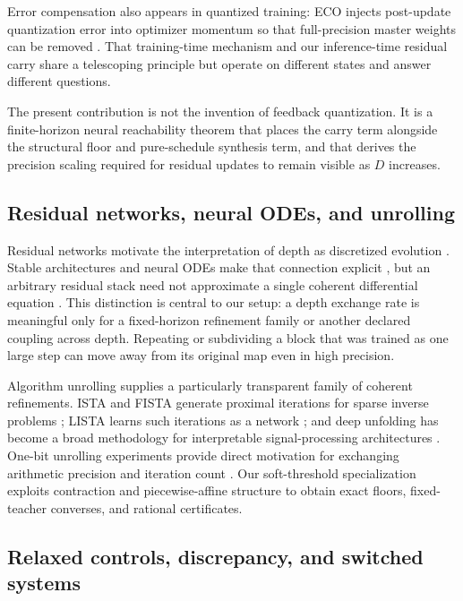 \documentclass[twoside,11pt]{article}
\begin{document}
Error compensation also appears in quantized training: ECO injects post-update quantization error into optimizer momentum so that full-precision master weights can be removed \citep{NikdanEtAl2026ECO}.  That training-time mechanism and our inference-time residual carry share a telescoping principle but operate on different states and answer different questions.

The present contribution is not the invention of feedback quantization.  It is a finite-horizon neural reachability theorem that places the carry term alongside the structural floor and pure-schedule synthesis term, and that derives the precision scaling required for residual updates to remain visible as $D$ increases.

\subsection{Residual networks, neural ODEs, and unrolling}

Residual networks motivate the interpretation of depth as discretized evolution \citep{HeEtAl2016}.  Stable architectures and neural ODEs make that connection explicit \citep{HaberRuthotto2018,ChenRubanovaBettencourtDuvenaud2018}, but an arbitrary residual stack need not approximate a single coherent differential equation \citep{SanderAblinPeyre2022}.  This distinction is central to our setup: a depth exchange rate is meaningful only for a fixed-horizon refinement family or another declared coupling across depth.  Repeating or subdividing a block that was trained as one large step can move away from its original map even in high precision.

Algorithm unrolling supplies a particularly transparent family of coherent refinements.  ISTA and FISTA generate proximal iterations for sparse inverse problems \citep{DaubechiesDefriseDeMol2004,BeckTeboulle2009}; LISTA learns such iterations as a network \citep{GregorLeCun2010}; and deep unfolding has become a broad methodology for interpretable signal-processing architectures \citep{ChenLiuWangYin2018,MongaLiEldar2021}.  One-bit unrolling experiments provide direct motivation for exchanging arithmetic precision and iteration count \citep{EamazYeganegiSoltanalian2025}.  Our soft-threshold specialization exploits contraction and piecewise-affine structure to obtain exact floors, fixed-teacher converses, and rational certificates.

\subsection{Relaxed controls, discrepancy, and switched systems}
\end{document}
